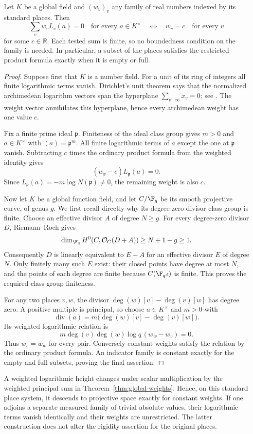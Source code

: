 \begin{theorem}\label{thm:global-weights}
Let $K$ be a global field and $(w_v)_v$ any family of real numbers indexed
by its standard places. Then
\[
 \sum_v w_vL_v(a)=0\quad\text{for every }a\in K^\times
 \quad\Longleftrightarrow\quad
 w_v=c\quad\text{for every }v
\]
for some $c\in\mathbb R$. Each tested sum is finite, so no boundedness
condition on the family is needed. In particular, a subset of the places
satisfies the restricted product formula exactly when it is empty or full.
\end{theorem}
\begin{proof}
Suppose first that $K$ is a number field. For a unit of its ring of
integers all finite logarithmic terms vanish. Dirichlet's unit theorem
says that the normalized archimedean logarithm vectors span the hyperplane
$\sum_{v\mid\infty}x_v=0$; see \citet[Theorem5.9]{MilneANT}.
The weight vector annihilates this hyperplane, hence every archimedean
weight has one value $c$.

Fix a finite prime ideal $\mathfrak p$. Finiteness of the ideal class group
\citep[Theorem4.4]{MilneANT} gives $m>0$ and $a\in K^\times$ with
$(a)=\mathfrak p^m$. All finite logarithmic terms of $a$ except the one at
$\mathfrak p$ vanish. Subtracting $c$ times the ordinary product formula
from the weighted identity gives
\[
 (w_{\mathfrak p}-c)L_{\mathfrak p}(a)=0.
\]
Since $L_{\mathfrak p}(a)=-m\log N(\mathfrak p)\ne0$, the remaining
weight is also $c$.

Now let $K$ be a global function field, and let $C/\F_q$ be its smooth
projective curve, of genus $g$. We first recall directly why its
degree-zero divisor class group is finite. Choose an effective divisor
$A$ of degree $N\ge g$. For every degree-zero divisor $D$, Riemann--Roch
\citep[Tag0B5B, Section53.5]{StacksRR} gives
\[
 \dim_{\F_q}H^0(C,\mathcal O_C(D+A))\ge N+1-g\ge1.
\]
Consequently $D$ is linearly equivalent to $E-A$ for an effective divisor
$E$ of degree $N$. Only finitely many such $E$ exist: their closed points
have degree at most $N$, and the points of each degree are finite because
$C(\F_{q^d})$ is finite. This proves the required class-group finiteness.

For any two places $v,w$, the divisor
$\deg(w)[v]-\deg(v)[w]$ has degree zero. A positive multiple is principal,
so choose $a\in K^\times$ and $m>0$ with
\[
 \operatorname{div}(a)
 =m\bigl(\deg(w)[v]-\deg(v)[w]\bigr).
\]
Its weighted logarithmic relation is
\[
 m\deg(v)\deg(w)\log q\,(w_w-w_v)=0.
\]
Thus $w_v=w_w$ for every pair. Conversely constant weights satisfy the
relation by the ordinary product formula. An indicator family is constant
exactly for the empty and full subsets, proving the final assertion.
\end{proof}

A weighted logarithmic height changes under scalar multiplication by the
weighted principal sum in Theorem~\ref{thm:global-weights}. Hence, on this
standard place system, it descends to projective space exactly for
constant weights. If one adjoins a separate measured family of trivial
absolute values, their logarithmic terms vanish identically and their
weights are unrestricted. The latter construction does not alter the
rigidity assertion for the original places.
